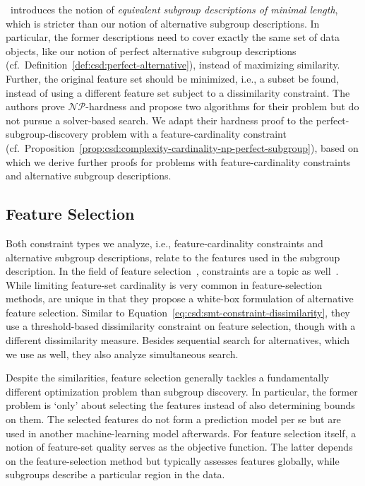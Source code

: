 \documentclass{article}
\theoremstyle{definition}
\begin{document}
\cite{boley2009non}~introduces the notion of \emph{equivalent subgroup descriptions of minimal length}, which is stricter than our notion of alternative subgroup descriptions.
In particular, the former descriptions need to cover exactly the same set of data objects, like our notion of perfect alternative subgroup descriptions (cf.~Definition~\ref{def:csd:perfect-alternative}), instead of maximizing similarity.
Further, the original feature set should be minimized, i.e., a subset be found, instead of using a different feature set subject to a dissimilarity constraint.
The authors prove $\mathcal{NP}$-hardness and propose two algorithms for their problem but do not pursue a solver-based search.
We adapt their hardness proof to the perfect-subgroup-discovery problem with a feature-cardinality constraint (cf.~Proposition~\ref{prop:csd:complexity-cardinality-np-perfect-subgroup}), based on which we derive further proofs for problems with feature-cardinality constraints and alternative subgroup descriptions.

\subsection{Feature Selection}
\label{sec:csd:related-work:feature-selection}

Both constraint types we analyze, i.e., feature-cardinality constraints and alternative subgroup descriptions, relate to the features used in the subgroup description.
In the field of feature selection~\cite{guyon2003introduction, li2017feature}, constraints are a topic as well~\cite{bach2023finding, bach2024alternative, bach2022empirical}.
While limiting feature-set cardinality is very common in feature-selection methods, \cite{bach2023finding, bach2024alternative} are unique in that they propose a white-box formulation of alternative feature selection.
Similar to Equation~\ref{eq:csd:smt-constraint-dissimilarity}, they use a threshold-based dissimilarity constraint on feature selection, though with a different dissimilarity measure.
Besides sequential search for alternatives, which we use as well, they also analyze simultaneous search.

Despite the similarities, feature selection generally tackles a fundamentally different optimization problem than subgroup discovery.
In particular, the former problem is `only' about selecting the features instead of also determining bounds on them.
The selected features do not form a prediction model per se but are used in another machine-learning model afterwards.
For feature selection itself, a notion of feature-set quality serves as the objective function.
The latter depends on the feature-selection method but typically assesses features globally, while subgroups describe a particular region in the data.
\end{document}

